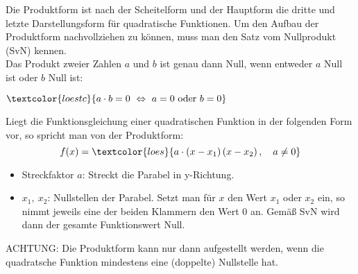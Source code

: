 Die Produktform ist nach der Scheitelform und der Hauptform die dritte und letzte Darstellungsform für quadratische Funktionen. Um den Aufbau der Produktform nachvollziehen zu können, muss man den Satz vom Nullprodukt (SvN) kennen.\\
Das Produkt zweier Zahlen \(a\) und \(b\) ist genau dann Null, wenn entweder \(a\) Null ist oder \(b\) Null ist:
\begin{tcolorbox}\centering
	$\textcolor{loestc}{a\cdot b=0\ \Leftrightarrow\ a=0\text{ oder }b=0}$
\end{tcolorbox}
Liegt die Funktionsgleichung einer quadratischen Funktion in der folgenden Form vor, so spricht man von der Produktform:
\[f(x)=\textcolor{loes}{a\cdot \left(x-x_1\right)\left(x-x_2\right), \quad a\neq 0}\]
\begin{itemize}
	\item Streckfaktor \(a\): \textcolor{loes}{Streckt die Parabel in y-Richtung.}\vspace{0.8cm}
	\item \(x_1,\ x_2\): \textcolor{loes}{Nullstellen der Parabel. Setzt man für \(x\) den Wert \(x_1\) oder \(x_2\) ein, so nimmt jeweils eine der beiden Klammern den Wert 0 an. Gemäß SvN wird dann der gesamte Funktionswert Null.}\vspace{0.8cm}
\end{itemize}
\begin{tcolorbox}\centering
	\textcolor{loestc}{ACHTUNG: Die Produktform kann nur dann aufgestellt werden, wenn die quadratsche Funktion mindestens eine (doppelte) Nullstelle hat.}
\end{tcolorbox}

